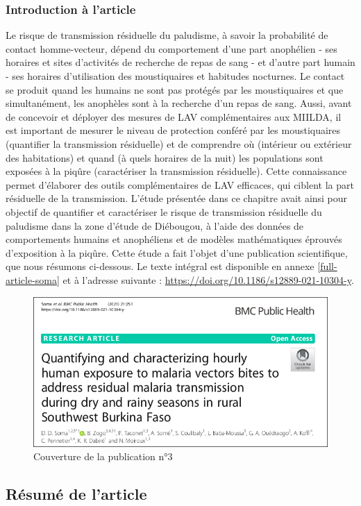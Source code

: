 \documentclass[12pt,twoside]{reedthesis}
\begin{document}
\hypertarget{introduction-uxe0-larticle}{%
\subsubsection{Introduction à l'article}\label{introduction-uxe0-larticle}}

Le risque de transmission résiduelle du paludisme, à savoir la probabilité de contact homme-vecteur, dépend du comportement d'une part anophélien - ses horaires et sites d'activités de recherche de repas de sang - et d'autre part humain - ses horaires d'utilisation des moustiquaires et habitudes nocturnes. Le contact se produit quand les humains ne sont pas protégés par les moustiquaires et que simultanément, les anophèles sont à la recherche d'un repas de sang. Aussi, avant de concevoir et déployer des mesures de LAV complémentaires aux MIILDA, il est important de mesurer le niveau de protection conféré par les moustiquaires (quantifier la transmission résiduelle) et de comprendre où (intérieur ou extérieur des habitations) et quand (à quels horaires de la nuit) les populations sont exposées à la piqûre (caractériser la transmission résiduelle). Cette connaissance permet d'élaborer des outils complémentaires de LAV efficaces, qui ciblent la part résiduelle de la transmission. L'étude présentée dans ce chapitre avait ainsi pour objectif de quantifier et caractériser le risque de transmission résiduelle du paludisme dans la zone d'étude de Diébougou, à l'aide des données de comportements humains et anophéliens et de modèles mathématiques éprouvés d'exposition à la piqûre. Cette étude a fait l'objet d'une publication scientifique, que nous résumons ci-dessous. Le texte intégral est disponible en annexe \ref{full-article-soma} et à l'adresse suivante : \url{https://doi.org/10.1186/s12889-021-10304-y}.\\
\begin{figure}

{\centering \includegraphics[width=1\linewidth]{figure/article0_couverture} 

}

\caption[Couverture de la publication n°3]{Couverture de la publication n°3}\label{fig:couv-art0}
\end{figure}
\hypertarget{summary-article-1}{%
\subsection{Résumé de l'article}\label{summary-article-1}}
\end{document}
